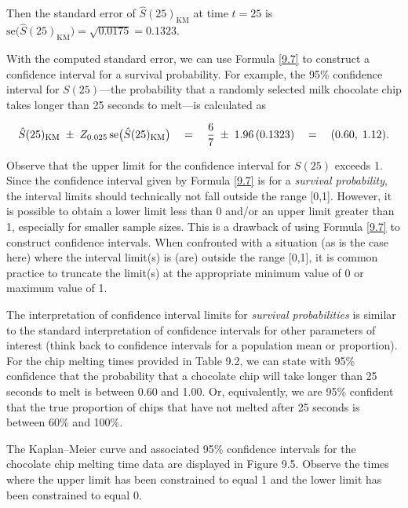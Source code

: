 \documentclass[
]{report}
\begin{document}
Then the standard error of \(\hat S(25)_{\mathrm{KM}}\) at time \(t=25\) is \(\mathrm{se}\bigl(\hat S(25)_{\mathrm{KM}}\bigr) = \sqrt{0.0175} = 0.1323\).

With the computed standard error, we can use Formula \ref{9.7} to construct a confidence interval for a survival probability. For example, the 95\% confidence interval for \(S(25)\)---the probability that a randomly selected milk chocolate chip takes longer than 25 seconds to melt---is calculated as

\begin{align}
\hat S(25)_{\mathrm{KM}} \;\pm\; Z_{0.025}\,\mathrm{se}\bigl(\hat S(25)_{\mathrm{KM}}\bigr)
\quad=\quad
\frac{6}{7}\;\pm\;1.96\,(0.1323)
\quad=\quad
(0.60,\;1.12).
\notag
\end{align}

Observe that the upper limit for the confidence interval for \(S(25)\) exceeds 1. Since the confidence interval given by Formula \ref{9.7} is for a \emph{survival probability}, the interval limits should technically not fall outside the range {[}0,1{]}. However, it is possible to obtain a lower limit less than 0 and/or an upper limit greater than 1, especially for smaller sample sizes. This is a drawback of using Formula \ref{9.7} to construct confidence intervals. When confronted with a situation (as is the case here) where the interval limit(s) is (are) outside the range {[}0,1{]}, it is common practice to truncate the limit(s) at the appropriate minimum value of 0 or maximum value of 1.

The interpretation of confidence interval limits for \emph{survival probabilities} is similar to the standard interpretation of confidence intervals for other parameters of interest (think back to confidence intervals for a population mean or proportion). For the chip melting times provided in Table 9.2, we can state with 95\% confidence that the probability that a chocolate chip will take longer than 25 seconds to melt is between 0.60 and 1.00. Or, equivalently, we are 95\% confident that the true proportion of chips that have not melted after 25 seconds is between 60\% and 100\%.

The Kaplan--Meier curve and associated 95\% confidence intervals for the chocolate chip melting time data are displayed in Figure 9.5. Observe the times where the upper limit has been constrained to equal 1 and the lower limit has been constrained to equal 0.
\end{document}
